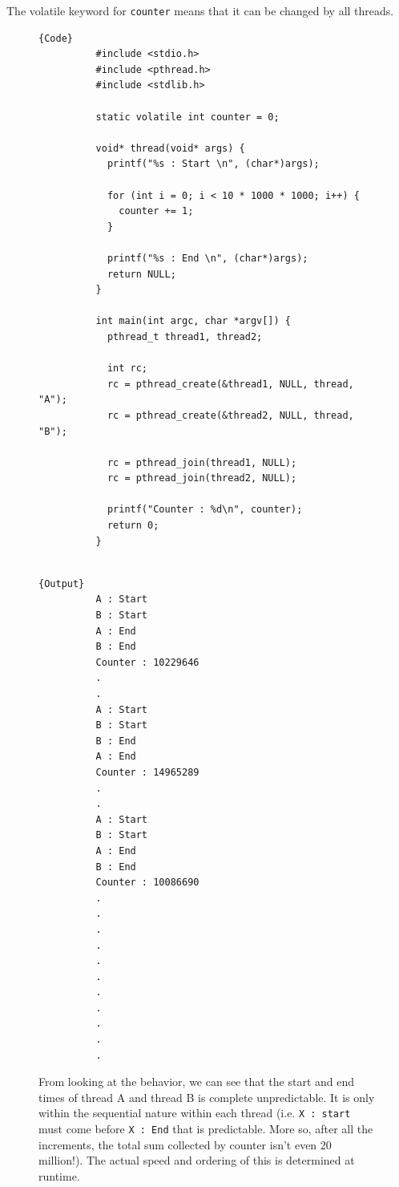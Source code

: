 \documentclass{article}
\newcounter{example}[section]
\begin{document}
    \begin{example}
      \label{ex:incrementing-shared-counter-between-two-threads}
      The volatile keyword for \texttt{counter} means that it can be changed by all threads. 

      \begin{figure}[H]
        \centering 
        \noindent\begin{minipage}{.75\textwidth}
        \begin{lstlisting}[]{Code}
          #include <stdio.h> 
          #include <pthread.h>
          #include <stdlib.h>

          static volatile int counter = 0; 

          void* thread(void* args) {
            printf("%s : Start \n", (char*)args); 

            for (int i = 0; i < 10 * 1000 * 1000; i++) {
              counter += 1; 
            }

            printf("%s : End \n", (char*)args); 
            return NULL; 
          }

          int main(int argc, char *argv[]) {
            pthread_t thread1, thread2; 

            int rc; 
            rc = pthread_create(&thread1, NULL, thread, "A"); 
            rc = pthread_create(&thread2, NULL, thread, "B"); 

            rc = pthread_join(thread1, NULL); 
            rc = pthread_join(thread2, NULL); 

            printf("Counter : %d\n", counter); 
            return 0; 
          }
                      
        \end{lstlisting}
        \end{minipage}
        \hfill
        \begin{minipage}{.24\textwidth}
        \begin{lstlisting}[]{Output}
          A : Start 
          B : Start 
          A : End 
          B : End 
          Counter : 10229646
          .
          .
          A : Start 
          B : Start 
          B : End 
          A : End 
          Counter : 14965289
          .
          .
          A : Start 
          B : Start 
          A : End 
          B : End 
          Counter : 10086690
          .
          .
          .
          .
          .
          .
          .
          .
          .
          .
          .
        \end{lstlisting}
        \end{minipage}
        \caption{From looking at the behavior, we can see that the start and end times of thread A and thread B is complete unpredictable. It is only within the sequential nature within each thread (i.e. \texttt{X : start} must come before \texttt{X : End} that is predictable. More so, after all the increments, the total sum collected by counter isn't even 20 million!). The actual speed and ordering of this is determined at runtime. } 
        \label{fig:unpredictable}
      \end{figure}


\end{example}
\end{document}
